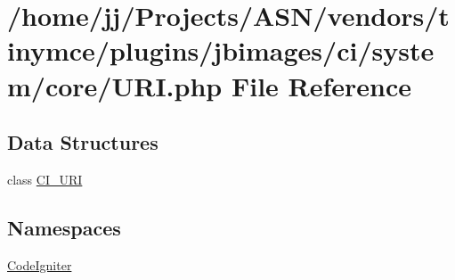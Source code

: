 \hypertarget{_u_r_i_8php}{}\section{/home/jj/\+Projects/\+A\+S\+N/vendors/tinymce/plugins/jbimages/ci/system/core/\+U\+RI.php File Reference}
\label{_u_r_i_8php}
\subsection*{Data Structures}
\begin{DoxyCompactItemize}
\item 
class \hyperlink{class_c_i___u_r_i}{C\+I\+\_\+\+U\+RI}
\end{DoxyCompactItemize}
\subsection*{Namespaces}
\begin{DoxyCompactItemize}
\item 
 \hyperlink{namespace_code_igniter}{Code\+Igniter}
\end{DoxyCompactItemize}
